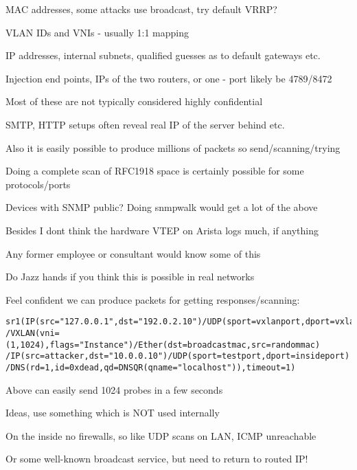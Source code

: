 \documentclass[Screen16to9,17pt]{foils}
\begin{document}
\begin{list2}
\item MAC addresses, some attacks use broadcast, try default VRRP?
\item VLAN IDs and VNIs - usually 1:1 mapping
\item IP addresses, internal subnets, qualified guesses as to default gateways etc.
\item Injection end points, IPs of the two routers, or one -
port likely be 4789/8472
\item Most of these are not typically considered highly confidential
\item SMTP, HTTP setups often reveal real IP of the server behind etc.
\item Also it is easily possible to produce millions of packets so send/scanning/trying
\item Doing a complete scan of RFC1918 space is certainly possible for some protocols/ports
\item Devices with SNMP public? Doing snmpwalk would get a lot of the above
\item Besides I dont think the hardware VTEP on Arista logs much, if anything
\end{list2}



\vskip 1cm
Any former employee or consultant would know some of this

Do Jazz hands if you think this is possible in real networks



Feel confident we can produce packets for getting responses/scanning:
\begin{verbatim}
sr1(IP(src="127.0.0.1",dst="192.0.2.10")/UDP(sport=vxlanport,dport=vxlanport)
/VXLAN(vni=(1,1024),flags="Instance")/Ether(dst=broadcastmac,src=randommac)
/IP(src=attacker,dst="10.0.0.10")/UDP(sport=testport,dport=insideport)
/DNS(rd=1,id=0xdead,qd=DNSQR(qname="localhost")),timeout=1)
\end{verbatim}

\begin{list2}
\item Above can easily send 1024 probes in a few seconds
\item Ideas, use something which is NOT used internally
\item On the inside no firewalls, so like UDP scans on LAN, ICMP unreachable
\item Or some well-known broadcast service, but need to return to routed IP!
\end{list2}
\end{document}
